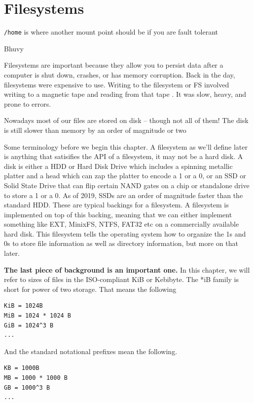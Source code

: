 \chapter{Filesystems}

\epigraph{\texttt{/home} is where another mount point should be if you are fault tolerant}{Bhuvy}

Filesystems are important because they allow you to persist data after a computer is shut down, crashes, or has memory corruption.
Back in the day, filesystems were expensive to use.
Writing to the filesystem or FS involved writing to a magnetic tape and reading from that tape .
It was slow, heavy, and prone to errors.

Nowadays most of our files are stored on disk -- though not all of them!
The disk is still slower than memory by an order of magnitude or two 


Some terminology before we begin this chapter.
A filesystem as we'll define later is anything that satisifies the API of a filesystem, it may not be a hard disk.
A disk is either a HDD or Hard Disk Drive which includes a spinning metallic platter and a head which can zap the platter to encode a 1 or a 0, or an SSD or Solid State Drive that can flip certain NAND gates on a chip or standalone drive to store a 1 or a 0.
As of 2019, SSDs are an order of magnitude faster than the standard HDD.
These are typical backings for a filesystem.
A filesystem is implemented on top of this backing, meaning that we can either implement something like EXT, MinixFS, NTFS, FAT32 etc on a commercially available hard disk.
This filesystem tells the operating system how to organize the 1s and 0s to store file information as well as directory information, but more on that later.

\textbf{The last piece of background is an important one.} In this chapter, we will refer to sizes of files in the ISO-compliant KiB or Kebibyte. The *iB family is short for power of two storage.
That means the following

\begin{verbatim}
KiB = 1024B
MiB = 1024 * 1024 B
GiB = 1024^3 B
...
\end{verbatim}

And the standard notational prefixes mean the following.

\begin{verbatim}
KB = 1000B
MB = 1000 * 1000 B
GB = 1000^3 B
...
\end{verbatim}


